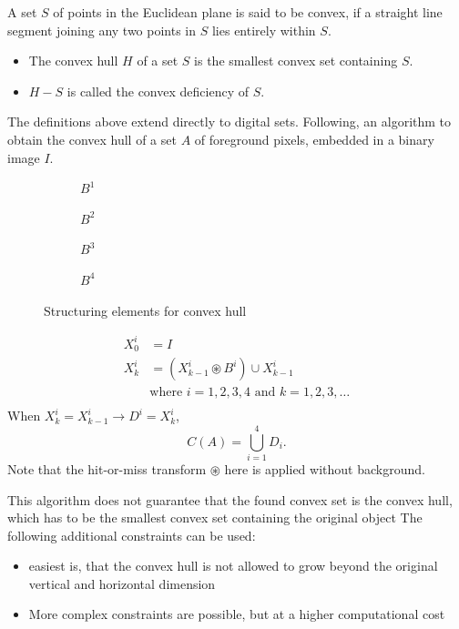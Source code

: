 A set $S$ of points in the Euclidean plane is said to be convex, if a straight line segment joining any two points in $S$ lies entirely within $S$.
\begin{itemize}
\item The convex hull $H$ of a set $S$ is the smallest convex set containing $S$.
\item $H-S$ is called the convex deficiency of $S$.
\end{itemize}
The definitions above extend directly to digital sets. Following, an algorithm to obtain the convex hull of a set $A$ of foreground pixels, embedded in a binary image $I$.
\begin{figure}[h]
	\centering
	\begin{subfigure}[b]{0.2\textwidth}
		\centering
		\caption{$B^1$}
	\end{subfigure}
	\begin{subfigure}[b]{0.2\textwidth}
		\centering
		\caption{$B^2$}
	\end{subfigure}
	\begin{subfigure}[b]{0.2\textwidth}
		\centering
		\caption{$B^3$}
	\end{subfigure}
	\begin{subfigure}[b]{0.2\textwidth}
		\centering
		\caption{$B^4$}
	\end{subfigure}
	\caption{Structuring elements for convex hull}
\end{figure}

\begin{align*}
	X_0^i &= I \\
	X_k^i &= (X_{k-1}^i \circledast B^i) \cup X_{k-1}^i \\
	&\text{where } i =1,2,3,4 \text{ and } k=1,2,3,\ldots \\
\end{align*}
When  \(X_k^i = X_{k-1}^i \longrightarrow D^i = X_k^i\),
\[
	C(A) = \bigcup\limits_{i=1}^4 D_i.
\]
Note that the hit-or-miss transform $\circledast$ here is applied without background.

This algorithm does not guarantee that the found convex set is the convex hull,
which has to be the smallest convex set containing the original object The
following additional constraints can be used:
\begin{itemize}
\item easiest is, that the convex hull is not allowed to grow beyond the original vertical and horizontal dimension
\item More complex constraints are possible, but at a higher computational cost
\end{itemize}

